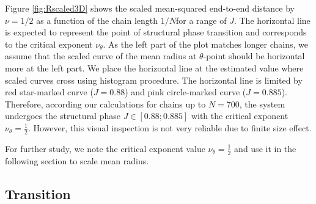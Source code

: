 Figure \ref{fig:Rscaled3D} shows the scaled
mean-squared end-to-end distance by $\nu=1/2$ as a function of the chain length
$1/N$for a range of $J$. The horizontal line is expected to represent the point of structural phase transition and corresponds to the critical exponent $\nu_{\theta}$. As the left part of the plot matches longer chains, we assume that the scaled curve of the mean radius at  $\theta$-point should be horizontal more at the left part. We place the horizontal line at the estimated value where scaled curves cross using histogram procedure. The horizontal line is limited by red star-marked curve ($J=0.88$)  and pink circle-marked curve ($J=0.885$).  Therefore, according our calculations for chains up to $N=700$, the system undergoes the structural phase $J \in [0.88;0.885] $ with the critical exponent $\nu_{\theta} = \frac{1}{2}$. However, this visual inspection is not very reliable due to finite size effect.  %

For further study, we note the critical exponent value $\nu_{\theta} = \frac{1}{2}$ and use it in the following section to scale mean radius. 


\subsection{Transition}\label{Transition_3D}

